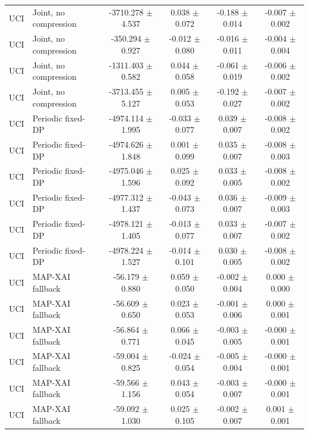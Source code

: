 \begin{table}[t]
\begin{tabular}{llcccc}
UCI & Joint, no compression & -3710.278 $\pm$ 4.537 & 0.038 $\pm$ 0.072 & -0.188 $\pm$ 0.014 & -0.007 $\pm$ 0.002 \\
UCI & Joint, no compression & -350.294 $\pm$ 0.927 & -0.012 $\pm$ 0.080 & -0.016 $\pm$ 0.011 & -0.004 $\pm$ 0.004 \\
UCI & Joint, no compression & -1311.403 $\pm$ 0.582 & 0.044 $\pm$ 0.058 & -0.061 $\pm$ 0.019 & -0.006 $\pm$ 0.002 \\
UCI & Joint, no compression & -3713.455 $\pm$ 5.127 & 0.005 $\pm$ 0.053 & -0.192 $\pm$ 0.027 & -0.007 $\pm$ 0.002 \\
UCI & Periodic fixed-DP & -4974.114 $\pm$ 1.995 & -0.033 $\pm$ 0.077 & 0.039 $\pm$ 0.007 & -0.008 $\pm$ 0.002 \\
UCI & Periodic fixed-DP & -4974.626 $\pm$ 1.848 & 0.001 $\pm$ 0.099 & 0.035 $\pm$ 0.007 & -0.008 $\pm$ 0.003 \\
UCI & Periodic fixed-DP & -4975.046 $\pm$ 1.596 & 0.025 $\pm$ 0.092 & 0.033 $\pm$ 0.005 & -0.008 $\pm$ 0.002 \\
UCI & Periodic fixed-DP & -4977.312 $\pm$ 1.437 & -0.043 $\pm$ 0.073 & 0.036 $\pm$ 0.007 & -0.009 $\pm$ 0.003 \\
UCI & Periodic fixed-DP & -4978.121 $\pm$ 1.405 & -0.013 $\pm$ 0.077 & 0.033 $\pm$ 0.007 & -0.007 $\pm$ 0.002 \\
UCI & Periodic fixed-DP & -4978.224 $\pm$ 1.527 & -0.014 $\pm$ 0.101 & 0.030 $\pm$ 0.005 & -0.008 $\pm$ 0.002 \\
UCI & MAP-XAI fallback & -56.179 $\pm$ 0.880 & 0.059 $\pm$ 0.050 & -0.002 $\pm$ 0.004 & 0.000 $\pm$ 0.000 \\
UCI & MAP-XAI fallback & -56.609 $\pm$ 0.650 & 0.023 $\pm$ 0.053 & -0.001 $\pm$ 0.006 & 0.000 $\pm$ 0.001 \\
UCI & MAP-XAI fallback & -56.864 $\pm$ 0.771 & 0.066 $\pm$ 0.045 & -0.003 $\pm$ 0.005 & -0.000 $\pm$ 0.001 \\
UCI & MAP-XAI fallback & -59.004 $\pm$ 0.825 & -0.024 $\pm$ 0.054 & -0.005 $\pm$ 0.004 & -0.000 $\pm$ 0.001 \\
UCI & MAP-XAI fallback & -59.566 $\pm$ 1.156 & 0.043 $\pm$ 0.054 & -0.003 $\pm$ 0.007 & -0.000 $\pm$ 0.001 \\
UCI & MAP-XAI fallback & -59.092 $\pm$ 1.030 & 0.025 $\pm$ 0.105 & -0.002 $\pm$ 0.007 & 0.001 $\pm$ 0.001 \\
\bottomrule
\end{tabular}
\end{table}

